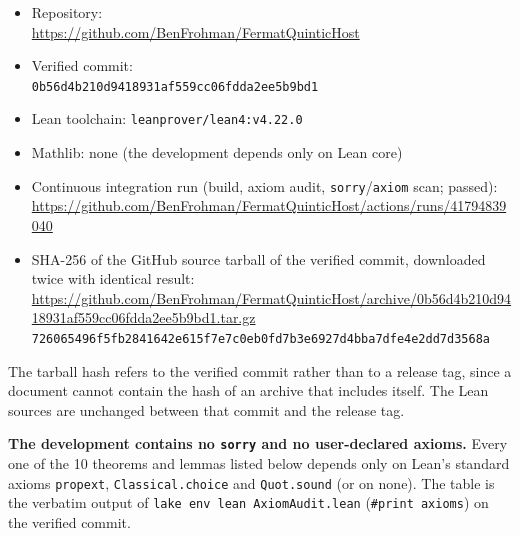 \documentclass[11pt]{amsart}
\theoremstyle{definition}
\theoremstyle{remark}
\begin{document}
{\raggedright
\begin{itemize}
\item Repository:\\ {\footnotesize\url{https://github.com/BenFrohman/FermatQuinticHost}}
\item Verified commit:\\ {\footnotesize\texttt{0b56d4b210d9418931af559cc06fdda2ee5b9bd1}}
\item Lean toolchain: \texttt{leanprover/lean4:v4.22.0}
\item Mathlib: none (the development depends only on Lean core)
\item Continuous integration run (build, axiom audit, \texttt{sorry}/\texttt{axiom} scan; passed):\\ {\footnotesize\url{https://github.com/BenFrohman/FermatQuinticHost/actions/runs/41794839040}}
\item SHA-256 of the GitHub source tarball of the verified commit, downloaded twice with identical result:\\ {\footnotesize\url{https://github.com/BenFrohman/FermatQuinticHost/archive/0b56d4b210d9418931af559cc06fdda2ee5b9bd1.tar.gz}}\\
{\footnotesize\texttt{726065496f5fb2841642e615f7e7c0eb0fd7b3e6927d4bba7dfe4e2dd7d3568a}}
\end{itemize}\par}

The tarball hash refers to the verified commit rather than to a release tag, since a document cannot contain the hash of an archive that includes itself. The Lean sources are unchanged between that commit and the release tag.

\textbf{The development contains no \texttt{sorry} and no user-declared axioms.} Every one of the 10 theorems and lemmas listed below depends only on Lean's standard axioms \texttt{propext}, \texttt{Classical.choice} and \texttt{Quot.sound} (or on none). The table is the verbatim output of \texttt{lake env lean AxiomAudit.lean} (\texttt{\#print axioms}) on the verified commit.
\end{document}

